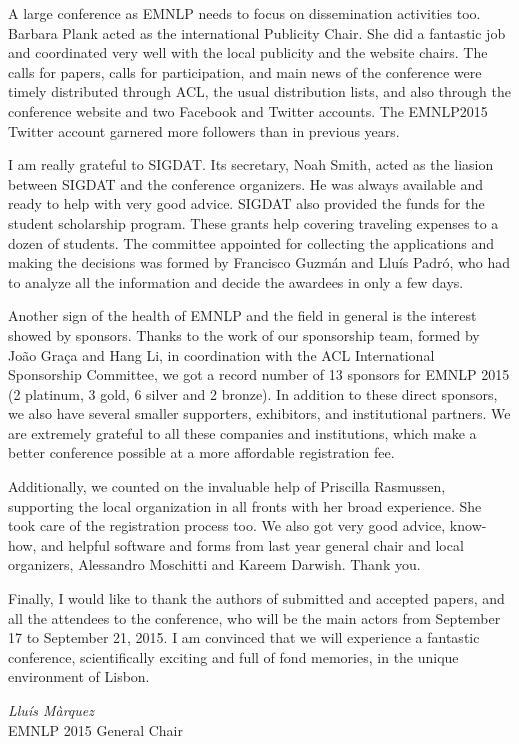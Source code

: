 A large conference as EMNLP needs to focus on dissemination activities
too. Barbara Plank acted as the international Publicity Chair. She
did a fantastic job and coordinated very well with the local publicity
and the website chairs. The calls for papers, calls for participation,
and main news of the conference were timely distributed through ACL,
the usual distribution lists, and also through the conference website
and two Facebook and Twitter accounts. The EMNLP2015 Twitter account
garnered more followers than in previous years.

I am really grateful to SIGDAT. Its secretary, Noah Smith, acted as
the liasion between SIGDAT and the conference organizers. He was always
available and ready to help with very good advice. SIGDAT also provided
the funds for the student scholarship program. These grants help covering
traveling expenses to a dozen of students. The committee appointed
for collecting the applications and making the decisions was formed
by Francisco Guzmán and Llu\'{i}s Padró, who had to analyze all the
information and decide the awardees in only a few days.

Another sign of the health of EMNLP and the field in general is the
interest showed by sponsors. Thanks to the work of our sponsorship
team, formed by João Graça and Hang Li, in coordination with the ACL
International Sponsorship Committee, we got a record number of 13
sponsors for EMNLP 2015 (2 platinum, 3 gold, 6 silver and 2 bronze).
In addition to these direct sponsors, we also have several smaller
supporters, exhibitors, and institutional partners. We are extremely
grateful to all these companies and institutions, which make a better
conference possible at a more affordable registration fee.

Additionally, we counted on the invaluable help of Priscilla Rasmussen,
supporting the local organization in all fronts with her broad experience.
She took care of the registration process too. We also got very good
advice, know-how, and helpful software and forms from last year general
chair and local organizers, Alessandro Moschitti and Kareem Darwish.
Thank you.

Finally, I would like to thank the authors of submitted and accepted
papers, and all the attendees to the conference, who will be the main
actors from September 17 to September 21, 2015. I am convinced that
we will experience a fantastic conference, scientifically exciting
and full of fond memories, in the unique environment of Lisbon. 

\begin{flushright}
\emph{Lluís Màrquez}\\
 EMNLP 2015 General Chair 
\par\end{flushright}

